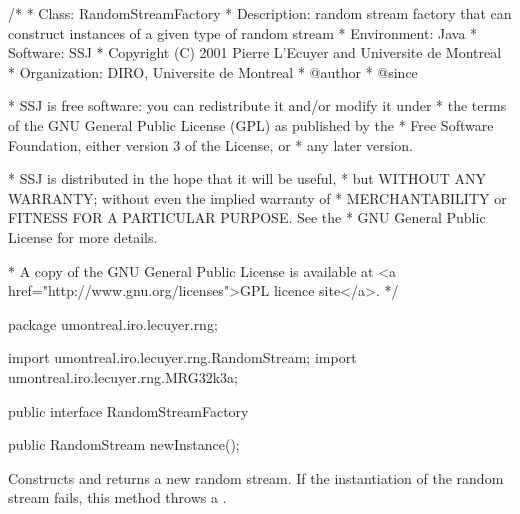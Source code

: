 \begin{code}
\begin{hide}
/*
 * Class:        RandomStreamFactory
 * Description:  random stream factory that can construct instances of
                 a given type of random stream
 * Environment:  Java
 * Software:     SSJ 
 * Copyright (C) 2001  Pierre L'Ecuyer and Universite de Montreal
 * Organization: DIRO, Universite de Montreal
 * @author       
 * @since

 * SSJ is free software: you can redistribute it and/or modify it under
 * the terms of the GNU General Public License (GPL) as published by the
 * Free Software Foundation, either version 3 of the License, or
 * any later version.

 * SSJ is distributed in the hope that it will be useful,
 * but WITHOUT ANY WARRANTY; without even the implied warranty of
 * MERCHANTABILITY or FITNESS FOR A PARTICULAR PURPOSE.  See the
 * GNU General Public License for more details.

 * A copy of the GNU General Public License is available at
   <a href="http://www.gnu.org/licenses">GPL licence site</a>.
 */
\end{hide}
package umontreal.iro.lecuyer.rng;\begin{hide}

import umontreal.iro.lecuyer.rng.RandomStream;
import umontreal.iro.lecuyer.rng.MRG32k3a;
\end{hide}

public interface RandomStreamFactory\begin{hide} {
\end{hide}

   public RandomStream newInstance();\begin{hide}

}\end{hide}
\end{code}
\begin{tabb}   Constructs and returns a new random stream.
 If the instantiation of the random stream fails,
 this method throws a .
\end{tabb}
\begin{htmlonly}
\end{htmlonly}
